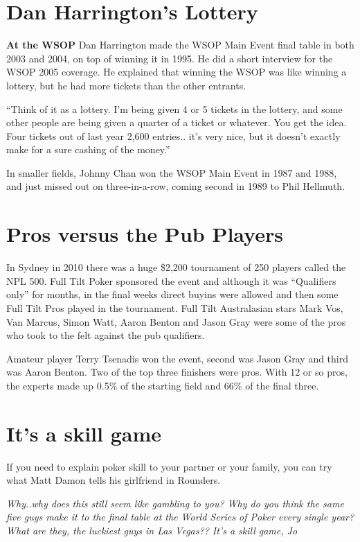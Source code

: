 \section{Dan Harrington's Lottery}

\textbf{At the WSOP} Dan Harrington made the WSOP Main Event final
table in both 2003 and 2004, on top of winning it in 1995. He
did a short interview for the WSOP 2005 coverage. He explained that
winning the WSOP was like winning a lottery, but he had more tickets
than the other entrants.

``Think of it as a lottery. I'm being given 4 or 5 tickets in the
lottery, and some other people are being given a quarter of a ticket
or whatever. You get the idea. Four tickets out of last year 2,600
entries.. it's very nice, but it doesn't exactly make for a sure
cashing of the money.''

In smaller fields, Johnny Chan won the WSOP Main Event in 1987 and
1988, and just missed out on three-in-a-row, coming second in 1989 to
Phil Hellmuth.

\section{Pros versus the Pub Players}

In Sydney in 2010 there was a huge \$2,200 tournament of 250 players
called the NPL 500. Full Tilt Poker sponsored the event and although
it was ``Qualifiers only'' for months, in the final weeks direct
buyins were allowed and then some Full Tilt Pros played in the
tournament.  Full Tilt Australasian stars Mark Vos, Van Marcus, Simon
Watt, Aaron Benton and Jason Gray were some of the pros who took to
the felt against the pub qualifiers.

Amateur player Terry Tsenadis won the event, second was Jason Gray and
third was Aaron Benton. Two of the top three finishers were pros. With
12 or so pros, the experts made up 0.5\% of the starting field and
66\% of the final three.

\section{It's a skill game}

If you need to explain poker skill to your partner or your family, you
can try what Matt Damon tells his girlfriend in Rounders.

\textit{Why..why does this still seem like gambling to you? Why do you
  think the same five guys make it to the final table at the World
  Series of Poker every single year? What are they, the luckiest guys
  in Las Vegas?? It's a skill game, Jo}
